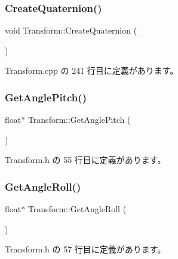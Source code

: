 \subsubsection{\texorpdfstring{Create\+Quaternion()}{CreateQuaternion()}}
{\footnotesize\ttfamily void Transform\+::\+Create\+Quaternion (\begin{DoxyParamCaption}{ }\end{DoxyParamCaption})\hspace{0.3cm}{\ttfamily [private]}}



 Transform.\+cpp の 241 行目に定義があります。

\mbox{\label{class_transform_a8c4966ea0a5d6cafa79c430e31bf0dff}} 
\subsubsection{\texorpdfstring{Get\+Angle\+Pitch()}{GetAnglePitch()}}
{\footnotesize\ttfamily float$\ast$ Transform\+::\+Get\+Angle\+Pitch (\begin{DoxyParamCaption}{ }\end{DoxyParamCaption})\hspace{0.3cm}{\ttfamily [inline]}}



 Transform.\+h の 55 行目に定義があります。

\mbox{\label{class_transform_a124d6afb5dd0a86952c99f1cec72e394}} 
\subsubsection{\texorpdfstring{Get\+Angle\+Roll()}{GetAngleRoll()}}
{\footnotesize\ttfamily float$\ast$ Transform\+::\+Get\+Angle\+Roll (\begin{DoxyParamCaption}{ }\end{DoxyParamCaption})\hspace{0.3cm}{\ttfamily [inline]}}



 Transform.\+h の 57 行目に定義があります。

\mbox{\label{class_transform_a8be9cd3526cc18d64e47b55f4c527dd8}} 
